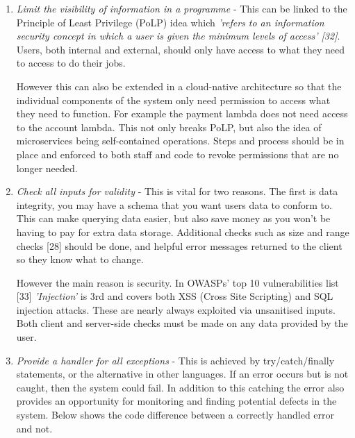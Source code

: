   \begin{enumerate}
    \label{sec:PoLP}
    \item \textit{Limit the visibility of information in a programme} - This can be linked to the Principle of Least Privilege (PoLP) idea which 
    \textit{'refers to an information security concept in which a user is given the minimum levels of access' [32]}. Users, both internal and external, 
    should only have access to what they need to access to do their jobs. 

    However this can also be extended in a cloud-native architecture so that the individual components of the system only need permission to access what 
    they need to function. For example the payment lambda does not need access to the account lambda. This not only breaks PoLP, but also the idea of
    microservices being self-contained operations. Steps and process should be in place and enforced to both staff and code to revoke permissions that are no
    longer needed.

    \item \textit{Check all inputs for validity} - This is vital for two reasons. The first is data integrity, you may have a schema that you want users
    data to conform to. This can make querying data easier, but also save money as you won't be having to pay for extra data storage. Additional checks such 
    as size and range checks [28] should be done, and helpful error messages returned to the client so they know what to change.
    
    However the main reason is security. In OWASPs' top 10 vulnerabilities list [33] \textit{'Injection'} is 3rd and covers both XSS (Cross Site Scripting) 
    and SQL injection attacks. These are nearly always exploited via unsanitised inputs. Both client and server-side checks must be made on any data
    provided by the user. 

    \item \textit{Provide a handler for all exceptions} - This is achieved by try/catch/finally statements, or the alternative in other languages. If an 
    error occurs but is not caught, then the system could fail. In addition to this catching the error also provides an opportunity for monitoring and 
    finding potential defects in the system. Below shows the code difference between a correctly handled error and not.


\end{enumerate}
